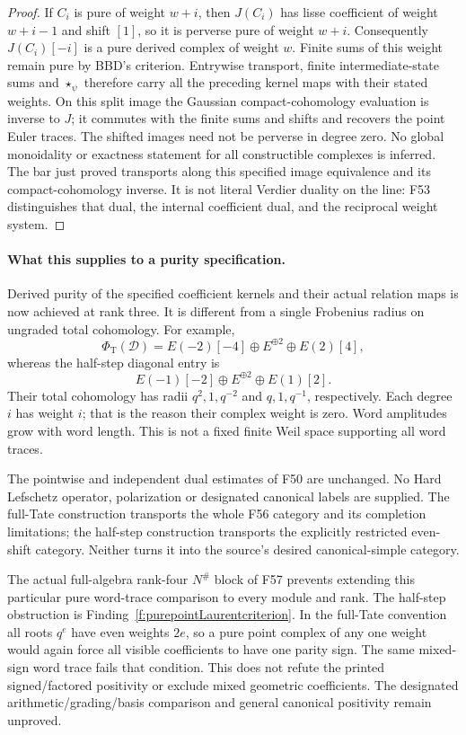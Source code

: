 \documentclass[11pt,a4paper]{article}
\newcommand{\fid}[1]{\textsf{#1}}\newcommand{\gate}[1]{\textsf{#1}}
\theoremstyle{named}\newtheorem{finding}{Finding}[section]
\theoremstyle{definition}\newtheorem{definition}[finding]{Definition}
\theoremstyle{remark}\newtheorem{remark}[finding]{Remark}
\begin{document}
\begin{proof}
If \(C_i\) is pure of weight \(w+i\), then \(J(C_i)\)
has lisse coefficient of weight \(w+i-1\) and shift
\([1]\), so it is perverse pure of weight \(w+i\).
Consequently \(J(C_i)[-i]\) is a pure derived complex
of weight \(w\). Finite sums of this weight remain pure
by BBD's criterion.
Entrywise transport, finite intermediate-state sums
and \(\star_\psi\) therefore carry all the preceding
kernel maps with their stated weights.
On this split image the Gaussian compact-cohomology
evaluation is inverse to \(J\); it commutes with the
finite sums and shifts and recovers the point Euler
traces.
The shifted images need not be perverse in degree zero.
No global monoidality or exactness statement for all
constructible complexes is inferred.
The bar just proved transports along this specified
image equivalence and its compact-cohomology inverse.
It is not literal Verdier duality on the line:
\fid{F53} distinguishes that dual, the internal
coefficient dual, and the reciprocal weight system.
\end{proof}

\paragraph{What this supplies to a purity specification.}
Derived purity of the specified coefficient kernels
and their actual relation maps is now achieved at
rank three. It is different from a single Frobenius
radius on ungraded total cohomology. For example,
\[
 \Phi_{\mathrm T}(\mathcal D)
    =E(-2)[-4]\oplus E^{\oplus2}\oplus E(2)[4],
\]
whereas the half-step diagonal entry is
\[
       E(-1)[-2]\oplus E^{\oplus2}\oplus E(1)[2].
\]
Their total cohomology has radii \(q^2,1,q^{-2}\)
and \(q,1,q^{-1}\), respectively. Each degree \(i\)
has weight \(i\); that is the reason their complex
weight is zero. Word amplitudes grow with word length.
This is not a fixed finite Weil space supporting
all word traces.

The pointwise and independent dual estimates of
\fid{F50} are unchanged. No Hard Lefschetz operator,
polarization or designated canonical labels are
supplied. The full-Tate construction transports the
whole F56 category and its completion limitations;
the half-step construction transports the explicitly
restricted even-shift category. Neither turns it into
the source's desired canonical-simple category.

The actual full-algebra rank-four \(N^\#\) block of
\fid{F57} prevents extending this particular pure
word-trace comparison to every module and rank.
The half-step obstruction is
Finding~\ref{f:purepointLaurentcriterion}.
In the full-Tate convention all roots \(q^e\) have
even weights \(2e\), so a pure point complex of any
one weight would again force all visible coefficients
to have one parity sign. The same mixed-sign word
trace fails that condition.
This does not refute the printed signed/factored
positivity or exclude mixed geometric coefficients.
The designated arithmetic/grading/basis comparison
and general canonical positivity remain unproved.
\end{document}
